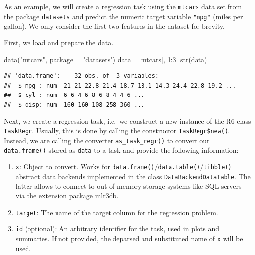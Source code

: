 \documentclass[
]{scrbook}
\newenvironment{Shaded}{\begin{snugshade}}{\end{snugshade}}
\newcommand{\AttributeTok}[1]{\textcolor[rgb]{0.77,0.63,0.00}{#1}}
\newcommand{\DecValTok}[1]{\textcolor[rgb]{0.00,0.00,0.81}{#1}}
\newcommand{\FunctionTok}[1]{\textcolor[rgb]{0.00,0.00,0.00}{#1}}
\newcommand{\NormalTok}[1]{#1}
\newcommand{\OtherTok}[1]{\textcolor[rgb]{0.56,0.35,0.01}{#1}}
\newcommand{\SpecialCharTok}[1]{\textcolor[rgb]{0.00,0.00,0.00}{#1}}
\newcommand{\StringTok}[1]{\textcolor[rgb]{0.31,0.60,0.02}{#1}}
\providecommand{\tightlist}{%
  \setlength{\itemsep}{0pt}\setlength{\parskip}{0pt}}
\renewenvironment{Shaded} {\begin{snugshade}\small} {\end{snugshade}}
\begin{document}
As an example, we will create a regression task using the \href{https://www.rdocumentation.org/packages/datasets/topics/mtcars}{\texttt{mtcars}} data set from the package \texttt{datasets} and predict the numeric target variable \texttt{"mpg"} (miles per gallon).
We only consider the first two features in the dataset for brevity.

First, we load and prepare the data.

\begin{Shaded}
\begin{Highlighting}[]
\FunctionTok{data}\NormalTok{(}\StringTok{"mtcars"}\NormalTok{, }\AttributeTok{package =} \StringTok{"datasets"}\NormalTok{)}
\NormalTok{data }\OtherTok{=}\NormalTok{ mtcars[, }\DecValTok{1}\SpecialCharTok{:}\DecValTok{3}\NormalTok{]}
\FunctionTok{str}\NormalTok{(data)}
\end{Highlighting}
\end{Shaded}

\begin{verbatim}
## 'data.frame':    32 obs. of  3 variables:
##  $ mpg : num  21 21 22.8 21.4 18.7 18.1 14.3 24.4 22.8 19.2 ...
##  $ cyl : num  6 6 4 6 8 6 8 4 4 6 ...
##  $ disp: num  160 160 108 258 360 ...
\end{verbatim}

Next, we create a regression task, i.e.~we construct a new instance of the R6 class \href{https://mlr3.mlr-org.com/reference/TaskRegr.html}{\texttt{TaskRegr}}.
Usually, this is done by calling the constructor \texttt{TaskRegr\$new()}.
Instead, we are calling the converter \href{https://mlr3.mlr-org.com/reference/as_task_regr.html}{\texttt{as\_task\_regr()}} to convert our \texttt{data.frame()} stored as \texttt{data} to a task and provide the following information:

\begin{enumerate}
\def\labelenumi{\arabic{enumi}.}
\setcounter{enumi}{1}
\tightlist
\item
  \texttt{x}: Object to convert. Works for \texttt{data.frame()}/\texttt{data.table()}/\texttt{tibble()} abstract data backends implemented in the class \href{https://mlr3.mlr-org.com/reference/DataBackendDataTable.html}{\texttt{DataBackendDataTable}}.
  The latter allows to connect to out-of-memory storage systems like SQL servers via the extension package \href{https://mlr3db.mlr-org.com}{mlr3db}.
\item
  \texttt{target}: The name of the target column for the regression problem.
\item
  \texttt{id} (optional): An arbitrary identifier for the task, used in plots and summaries.
  If not provided, the deparsed and substituted name of \texttt{x} will be used.
\end{enumerate}
\end{document}
